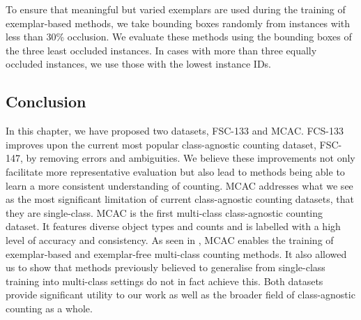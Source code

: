 \documentclass[../thesis.tex]{subfiles}
\begin{document}
To ensure that meaningful but varied exemplars are used during the training of exemplar-based methods, we take bounding boxes randomly from instances with less than 30\% occlusion.
We evaluate these methods using the bounding boxes of the three least occluded instances. In cases with more than three equally occluded instances, we use those with the lowest instance IDs. 

\subsection{Conclusion}
In this chapter, we have proposed two datasets, FSC-133 and MCAC.
FCS-133 improves upon the current most popular class-agnostic counting dataset, FSC-147, by removing errors and ambiguities. 
We believe these improvements not only facilitate more representative evaluation but also lead to methods being able to learn a more consistent understanding of counting. 
MCAC addresses what we see as the most significant limitation of current class-agnostic counting datasets, that they are single-class.
MCAC is the first multi-class class-agnostic counting dataset. 
It features diverse object types and counts and is labelled with a high level of accuracy and consistency.
As seen in , MCAC enables the training of exemplar-based and exemplar-free multi-class counting methods. 
It also allowed us to show that methods previously believed to generalise from single-class training into multi-class settings do not in fact achieve this.
Both datasets provide significant utility to our work as well as the broader field of class-agnostic counting as a whole.
\end{document}
